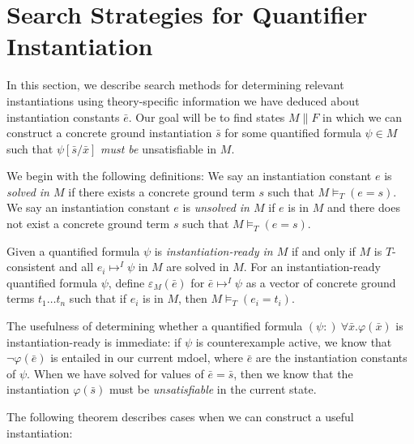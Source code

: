 \documentclass{llncs}
\begin{document}
\section{Search Strategies for Quantifier Instantiation}

In this section, we describe search methods for determining relevant instantiations using theory-specific information we have deduced about instantiation constants $\bar{e}$.
Our goal will be to find states $M \parallel F$ in which we can construct a concrete ground instantiation $\bar{s}$ for some quantified formula $\psi \in M$ such that $\psi [\bar{s}/\bar{x}]$ \emph{must be} unsatisfiable in $M$.

We begin with the following definitions:
We say an instantiation constant $e$ is \emph{solved in $M$} if there exists a concrete ground term $s$ such that $M \models_T (e = s)$.
We say an instantiation constant $e$ is \emph{unsolved in $M$} if $e$ is in $M$ and there does not exist a concrete ground term $s$ such that $M \models_T (e = s)$.

Given a quantified formula $\psi$ is \emph{instantiation-ready in $M$} if and only if $M$ is $T$-consistent and all $e_i \mapsto^I \psi$ in $M$ are solved in $M$.
For an instantiation-ready quantified formula $\psi$, define $\varepsilon_M( \bar{e} )$ for $\bar{e} \mapsto^I \psi$ as a vector of concrete ground terms $t_1 \ldots t_n$ such that if $e_i$ is in $M$, then $M \models_T (e_i = t_i)$.

The usefulness of determining whether a quantified formula $(\psi:) \ \forall \bar{x}. \varphi( \bar{x} )$ is instantiation-ready is immediate:  if $\psi$ is counterexample active, we know that $\neg \varphi( \bar{e} )$ is entailed in our current mdoel, where $\bar{e}$ are the instantiation constants of $\psi$.
When we have solved for values of $\bar{e} = \bar{s}$, then we know that the instantiation $\varphi( \bar{s} )$ must be \emph{unsatisfiable} in the current state.

The following theorem describes cases when we can construct a useful instantiation:
\end{document}
